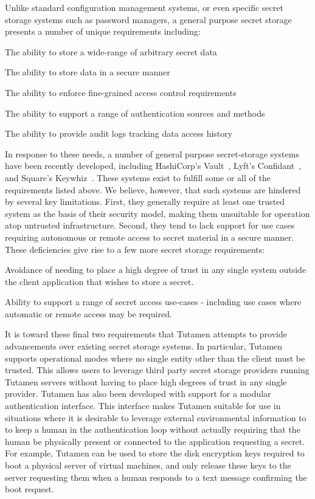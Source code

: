 Unlike standard configuration management systems, or even specific
secret storage systems such as password managers, a general purpose
secret storage presents a number of unique requirements including:

\begin{packed_item}
\item The ability to store a wide-range of arbitrary secret data
\item The ability to store data in a secure manner
\item The ability to enforce fine-grained access control requirements
\item The ability to support a range of authentication sources and methods
\item The ability to provide audit logs tracking data access history
\end{packed_item}

In response to these needs, a number of general purpose secret-storage
systems have been recently developed, including HashiCorp's
Vault~\cite{vault}, Lyft's Confidant~\cite{confidant}, and Square's
Keywhiz~\cite{keywhiz}. These systems exist to fulfill some or all of
the requirements listed above. We believe, however, that such systems
are hindered by several key limitations. First, they generally require
at least one trusted system as the basis of their security model,
making them unsuitable for operation atop untrusted
infrastructure. Second, they tend to lack support for use cases
requiring autonomous or remote access to secret material in a secure
manner. These deficiencies give rise to a few more secret
storage requirements:

\begin{packed_item}
\item Avoidance of needing to place a high degree of trust in any
  single system outside the client application that wishes to store a
  secret.
\item Ability to support a range of secret access use-cases -
  including use cases where automatic or remote access may be required.
\end{packed_item}

It is toward these final two requirements that Tutamen attempts to
provide advancements over existing secret storage systems. In
particular, Tutamen supports operational modes where no single entity
other than the client must be trusted. This allows users to leverage
third party secret storage providers running Tutamen servers without
having to place high degrees of trust in any single provider. Tutamen
has also been developed with support for a modular authentication
interface. This interface makes Tutamen suitable for use in situations
where it is desirable to leverage external environmental information
to to keep a human in the authentication loop without actually
requiring that the human be physically present or connected to the
application requesting a secret. For example, Tutamen can be used to
store the disk encryption keys required to boot a physical server of
virtual machines, and only release these keys to the server requesting
them when a human responds to a text message confirming the boot
request.



